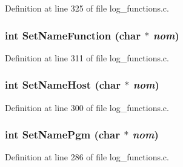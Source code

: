Definition at line 325 of file log\_\-functions.c.
\subsubsection[{SetNameFunction}]{\setlength{\rightskip}{0pt plus 5cm}int SetNameFunction (char $\ast$ {\em nom})}\label{log__functions_8c_132221b3d8a89c38196fbe9e7c4ab897}




Definition at line 311 of file log\_\-functions.c.
\subsubsection[{SetNameHost}]{\setlength{\rightskip}{0pt plus 5cm}int SetNameHost (char $\ast$ {\em nom})}\label{log__functions_8c_1f29c13951aff70e64c5538a4ebf2152}




Definition at line 300 of file log\_\-functions.c.
\subsubsection[{SetNamePgm}]{\setlength{\rightskip}{0pt plus 5cm}int SetNamePgm (char $\ast$ {\em nom})}\label{log__functions_8c_90b86f8decaae4e419afb514799e7f6b}




Definition at line 286 of file log\_\-functions.c.
